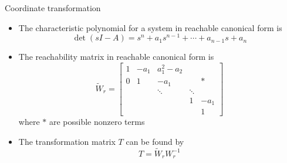 \documentclass[10pt]{beamer-control}
\begin{document}
\begin{frame}{Coordinate transformation}
  \begin{itemize}
    \item The characteristic polynomial for a system in reachable canonical form is
      \begin{equation}
        \operatorname{det}(sI-A)= s^n+a_1s^{n-1}+\cdots + a_{n-1}s+a_n
      \end{equation}
    \item The reachability matrix in reachable canonical form is
      \begin{equation}
        \tilde{W}_r = \begin{bmatrix}
          1 & -a_1 & a_1^2-a_2 & & \\
          0 & 1 & -a_1 & & * \\
          & & \ddots & \ddots & \\
          &  & & 1 & -a_1 \\
          & & & & 1
        \end{bmatrix}
      \end{equation}
      where $*$ are possible nonzero terms
    \item The transformation matrix $T$ can be found by
      \begin{equation}
        T=\tilde{W}_r W_r^{-1}
      \end{equation}
  \end{itemize}
\end{frame}


\SUMMARYFRAME
\FINALE
\end{document}
